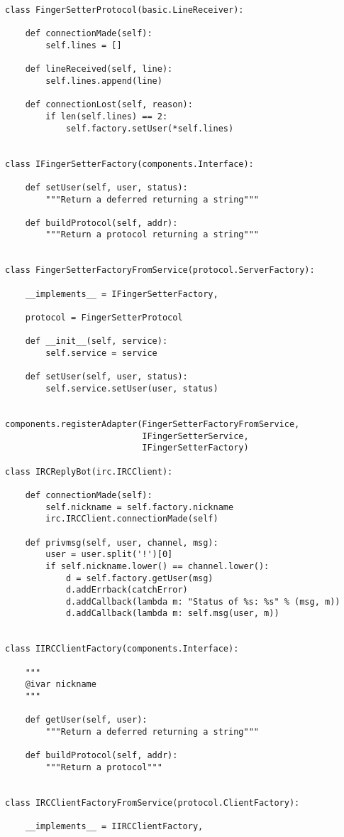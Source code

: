 \begin{verbatim}
class FingerSetterProtocol(basic.LineReceiver):

    def connectionMade(self):
        self.lines = []

    def lineReceived(self, line):
        self.lines.append(line)

    def connectionLost(self, reason):
        if len(self.lines) == 2:
            self.factory.setUser(*self.lines)


class IFingerSetterFactory(components.Interface):

    def setUser(self, user, status):
        """Return a deferred returning a string"""

    def buildProtocol(self, addr):
        """Return a protocol returning a string"""


class FingerSetterFactoryFromService(protocol.ServerFactory):

    __implements__ = IFingerSetterFactory,

    protocol = FingerSetterProtocol

    def __init__(self, service):
        self.service = service

    def setUser(self, user, status):
        self.service.setUser(user, status)


components.registerAdapter(FingerSetterFactoryFromService,
                           IFingerSetterService,
                           IFingerSetterFactory)

class IRCReplyBot(irc.IRCClient):

    def connectionMade(self):
        self.nickname = self.factory.nickname
        irc.IRCClient.connectionMade(self)

    def privmsg(self, user, channel, msg):
        user = user.split('!')[0]
        if self.nickname.lower() == channel.lower():
            d = self.factory.getUser(msg)
            d.addErrback(catchError)
            d.addCallback(lambda m: "Status of %s: %s" % (msg, m))
            d.addCallback(lambda m: self.msg(user, m))


class IIRCClientFactory(components.Interface):

    """
    @ivar nickname
    """

    def getUser(self, user):
        """Return a deferred returning a string"""

    def buildProtocol(self, addr):
        """Return a protocol"""


class IRCClientFactoryFromService(protocol.ClientFactory):

    __implements__ = IIRCClientFactory,


\end{verbatim}
